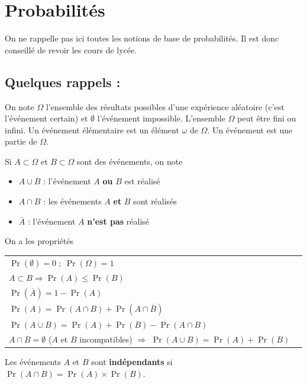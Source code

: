 \documentclass[12pt, a4paper]{book}
\numberwithin{equation}{section}
\begin{document}
\tableofcontents

\mainmatter




\chapter{Probabilités}

On ne rappelle pas ici toutes les notions de base de probabilités. Il est donc conseillé de revoir les cours de lycée.

\section{Quelques rappels :} On note $\Omega$ l'ensemble des résultats possibles d'une expérience
aléatoire (c'est l'événement  certain) et $\emptyset$ l'événement impossible. L'ensemble $\Omega$
peut être fini ou infini. Un événement élémentaire est un élément $\omega$ de $\Omega$. Un
événement est une partie de $\Omega$.

 Si $A\subset\Omega$ et $B\subset\Omega$ sont des événements, on note
\begin{itemize}
\item[] $A\cup B$ : l'événement $A$ {\bf ou} $B$ est réalisé
\item[] $A\cap B$ : les événements $A$ {\bf et} $B$ sont réalisés
\item[] $\overline{A}$ : l'événement $A$ {\bf n'est pas} réalisé
\end{itemize}
On a les propriétés
\begin{center}
\begin{tabular}{|ll|}
\hline
$\Pr(\emptyset) = 0 \;;\;  \Pr(\Omega) = 1 $ & \\
$A \subset B \Longrightarrow \Pr(A) \leq \Pr(B)$ & \\
$\Pr(\overline{A}) = 1-\Pr(A)$ & \\
$\Pr(A) = \Pr(A \cap B) + \Pr(A \cap \overline{B})$ & \\
$\Pr(A\cup B) = \Pr(A) + \Pr(B) - \Pr(A \cap B)$ & \\
$A \cap B = \emptyset$ ($A$ et $B$ incompatibles) $\Longrightarrow$  $\Pr(A \cup B) = \Pr(A)+\Pr(B)$ & \\
\hline
\end{tabular}
\end{center}
\noindent Les événements $A$ et $B$ sont {\bf indépendants} si $\Pr(A\cap B)=\Pr(A)\times \Pr(B)$.\\
\end{document}
